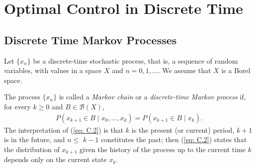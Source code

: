 \documentclass[\topdir/lecture\_notes.tex]{subfiles}
\begin{document}
\section{Optimal Control in Discrete Time}

\subsection{Discrete Time Markov Processes}
Let $\{x_{n}\}$ be a discrete-time stochastic process, that is, a sequence of random variables, with values in a space $X$ and  $n=0,1, \ldots$. We assume that $X$ is a Borel space.

The process $\{x_{n}\}$ is called a \emph{Markov chain} or a \emph{discrete-time Markov process} if, for every $k \geq 0$ and $B \in \mathcal{B}(X)$,
\begin{align}
P(x_{k+1} \in B \mid x_{0}, \ldots, x_{k})=P(x_{k+1} \in B \mid x_{k}). \label{eq: C.2}
\end{align}
The interpretation of (\ref{eq: C.2}) is that $k$ is the present (or current) period, $k+1$ is in the future, and $n \leq$ $k-1$ constitutes the past; then (\ref{eq: C.2}) states that the distribution of $x_{k+1}$ given the history of the process up to the current time $k$ depends only on the current state $x_{k}$.
\end{document}
